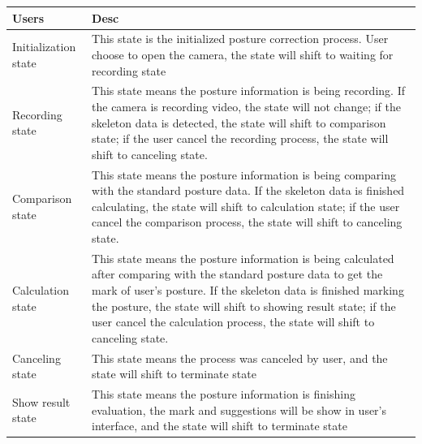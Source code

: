 \documentclass[16pt]{scrreprt}
\begin{document}
\begin{center}
    \begin{tabular}{p{5cm}p{12cm}}
        \hline
        Users & Desc\\
        \hline
        Initialization state &  This state is the initialized posture correction process. User choose to open the camera, the state will shift to waiting for recording state \\
        \hline
        Recording state & This state means the posture information is being recording. If the camera is recording video, the state will not change; if the skeleton data is detected, the state will shift to comparison state; if the user cancel the recording process, the state will shift to canceling state.\\
        \hline
        Comparison state & This state means the posture information is being comparing with the standard posture data. If the skeleton data is finished calculating, the state will shift to calculation state; if the user cancel the comparison process, the state will shift to canceling state.\\
        \hline
        Calculation state & This state means the posture information is being calculated after comparing with the standard posture data to get the mark of user's posture. If the skeleton data is finished marking the posture, the state will shift to showing result state; if the user cancel the calculation process, the state will shift to canceling state.\\
        \hline
        Canceling state & This state means the process was canceled by user, and the state will shift to terminate state\\
        \hline
        Show result state & This state means the posture information is finishing evaluation, the mark and suggestions will be show in user's interface, and the state will shift to terminate state\\
        \hline
    \end{tabular}
\end{center}




\end{document}
